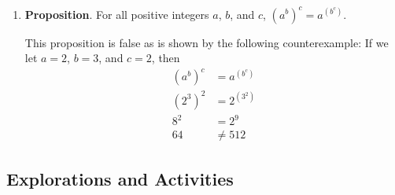 \begin{enumerate}
\begin{enumerate}
\item \textbf{Proposition}.  For all positive integers $a$, $b$, and $c$, 
$\left( a^b \right)^c = a^{\left( b^c \right)}$.

This proposition is false as is shown by the following counterexample:  If we let $a = 2$, $b = 3$, and $c = 2$, then
\begin{align*}
\left( a^b \right)^c &= a^{\left( b^c \right)} \\
\left( 2^3 \right)^2 &= 2^{\left( 3^2 \right)} \\
8^2 &= 2^9 \\
64 &\ne 512
\end{align*}
\end{enumerate}
\end{enumerate}

\subsection*{Explorations and Activities}
\setcounter{oldenumi}{\theenumi}

